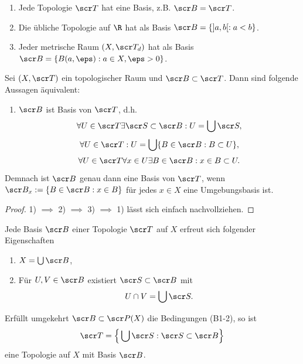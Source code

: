 \begin{ex}
	\begin{enumerate}[1)]
		\item
			Jede Topologie $\scr T$ hat eine Basis, z.B. $\scr B = \scr T$.
		\item
			Die übliche Topologie auf $\R$ hat als Basis $\scr B = \{ ]a,b[ : a < b \}$.
		\item
			Jeder metrische Raum $(X, \scr T_d)$ hat als Basis $\scr B = \{ B(a, \eps) : a \in X, \eps > 0 \}$.
	\end{enumerate}
\end{ex}


\begin{prop}
	Sei $(X, \scr T)$ ein topologischer Raum und $\scr B \subset \scr T$.
	Dann sind folgende Aussagen äquivalent:
	\begin{enumerate}[1)]
		\item
			$\scr B$ ist Basis von $\scr T$, d.h.
			\[
				\forall U \in \scr T \exists \scr S \subset \scr B : U = \bigcup \scr S,
			\]
		\itemdm
			\[
				\forall U \in \scr T : U = \bigcup \{ B \in \scr B : B \subset U \},
			\]
		\itemdm
			\[
				\forall U \in \scr T \forall x \in U \exists B \in \scr B : x \in B \subset U.
			\]
	\end{enumerate}
	Demnach ist $\scr B$ genau dann eine Basis von $\scr T$, wenn $\scr B_x := \{ B \in \scr B : x \in B \}$ für jedes $x \in X$ eine Umgebungsbasis ist.
	\begin{proof}
		1) $\implies$ 2) $\implies$ 3) $\implies$ 1) lässt sich einfach nachvollziehen.
	\end{proof}
\end{prop}

\begin{st}
	Jede Basis $\scr B$ einer Topologie $\scr T$ auf $X$ erfreut sich folgender Eigenschaften
	\begin{enumerate}[(B1)]
		\item
			$X = \bigcup \scr B$,
		\item
			Für $U, V \in \scr B$ existiert $\scr S \subset \scr B$ mit
			\[
				U \cap V = \bigcup \scr S.
			\]
	\end{enumerate}

	Erfüllt umgekehrt $\scr B \subset \scr P(X)$ die Bedingungen (B1-2), so ist
	\[
		\scr T = \Big\{ \bigcup \scr S : \scr S \subset \scr B \Big\}
	\]
	eine Topologie auf $X$ mit Basis $\scr B$.
\end{st}

